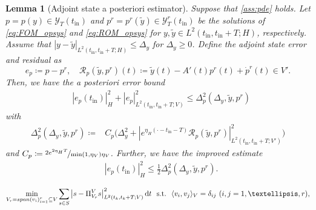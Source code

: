 \documentclass[10pt,a4paper]{amsart}
\newtheorem{lemma}{Lemma}
\newcommand{\Res}{\calR}%
\newcommand{\calR}{\mathcal{R}}
\newcommand{\linspan}{\mathop{\rm span}\nolimits}
\newcommand{\mY}{{\mathscr Y}}
\newcommand{\norm}[2]{\left|#1\right|_{#2}}
\newcommand{\reduce}[1]{{{#1}^r}}
\newcommand{\tint}{t_{\mathrm{in}}}
\begin{document}
\begin{lemma}[Adjoint state a posteriori estimator]
    \label{lem:ResAdjest}
    Suppose that \cref{ass:pde} holds. Let $p=p(y)\in\mY_T(\tint)$ and $p^r=p^r(\tilde y)\in\mY^r_T(\tint)$ be the solutions of \eqref{eq:FOM_opsys} and \eqref{eq:ROM_opsys} for $y,\tilde y\in L^2(\tint,\tint+T;H)$, respectively. Assume that $\norm{y-\tilde y}{L^2(\tint,\tint+T;H)} \leq \Delta_y $
    for $\Delta_y\geq 0$. Define the adjoint state error and residual as
    \begin{equation*}
        e_p\coloneqq p-p^r, \quad \Res_p(\tilde y, p^r)(t)\coloneqq\tilde y(t)-A'(t)p^r(t)+\dot p^r(t)\in V'.
    \end{equation*}
    Then, we have the \emph{a posteriori} error bound
    \begin{align}\label{eq:adjstate_apost_CHL2V}
        &\norm{e_p(\tint)}{H}^2+\norm{e_p}{L^2(\tint,\tint+T;V)}^2\leq \Delta_p^2(\Delta_y,\tilde y, p^r)
    \end{align}
    with
    \begin{align}\label{eq:adjstate_apost_CHL2V_struc}
        \Delta_{p}^2{(\Delta_y,\tilde y, p^r)}  \coloneqq & C_{p}\Big(\Delta_y^2 + \norm{e^{\eta_H (\cdot-\tint-T) }\Res_p(\tilde y, \reduce p)}{L^2(\tint,\tint+T;V')}^2\Big)
    \end{align}
    and $C_{p}\coloneqq\nicefrac{2e^{2\eta_H T}}{\min(1,\eta_V)\eta_V}$. Further, we have the improved estimate
    \begin{align}\label{eq:adjstate_apost_Ht}
        &\norm{e_p(\tint)}{H}^2\leq \tfrac{1}{2} \Delta_{p}^2 {(\Delta_y,\tilde y, p^r)}.%
    \end{align}
\end{lemma}

\begin{align}
    \label{eqn:PODminimization}
     \min_{V_r=\linspan(v_i)_{i=1}^r\subseteq V} \sum_{s\in S}\norm{s-\Pi^V_{V_r}s }{L^2(t_k,t_k+T;V)}^2\mathrm dt
     \ \  \text{s.t.}\ \ \langle v_i, v_j\rangle_V = \delta_{ij} \ (i,j = 1,\ldots, r),
\end{align}
\end{document}
